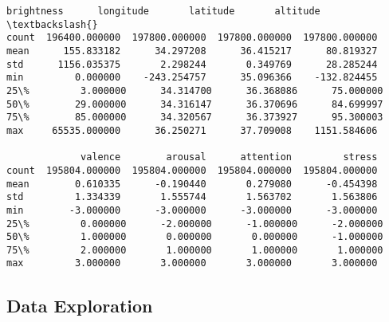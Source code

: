 \documentclass[11pt]{article}
\makeatletter
\newcommand{\boxspacing}{\kern\kvtcb@left@rule\kern\kvtcb@boxsep}
\newcommand{\prompt}[4]{
        {\ttfamily\llap{{\color{#2}[#3]:\hspace{3pt}#4}}\vspace{-\baselineskip}}
    }
\makeatother
\begin{document}
            \begin{tcolorbox}[breakable, size=fbox, boxrule=.5pt, pad at break*=1mm, opacityfill=0]
\prompt{Out}{outcolor}{122}{\boxspacing}
\begin{Verbatim}[commandchars=\\\{\}]
          brightness      longitude       latitude       altitude  \textbackslash{}
count  196400.000000  197800.000000  197800.000000  197800.000000
mean      155.833182      34.297208      36.415217      80.819327
std      1156.035375       2.298244       0.349769      28.285244
min         0.000000    -243.254757      35.096366    -132.824455
25\%         3.000000      34.314700      36.368086      75.000000
50\%        29.000000      34.316147      36.370696      84.699997
75\%        85.000000      34.320567      36.373927      95.300003
max     65535.000000      36.250271      37.709008    1151.584606

             valence        arousal      attention         stress
count  195804.000000  195804.000000  195804.000000  195804.000000
mean        0.610335      -0.190440       0.279080      -0.454398
std         1.334339       1.555744       1.563702       1.563806
min        -3.000000      -3.000000      -3.000000      -3.000000
25\%         0.000000      -2.000000      -1.000000      -2.000000
50\%         1.000000       0.000000       0.000000      -1.000000
75\%         2.000000       1.000000       1.000000       1.000000
max         3.000000       3.000000       3.000000       3.000000
\end{Verbatim}
\end{tcolorbox}
        
    \subsection{Data Exploration}\label{data-exploration}
\end{document}
